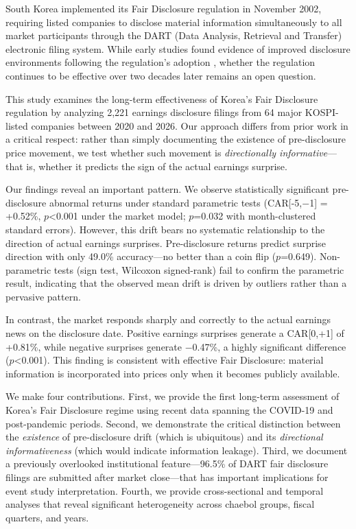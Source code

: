 \documentclass[review,authoryear]{elsarticle}
\begin{document}
South Korea implemented its Fair Disclosure regulation in November 2002, requiring listed companies to disclose material information simultaneously to all market participants through the DART (Data Analysis, Retrieval and Transfer) electronic filing system. While early studies found evidence of improved disclosure environments following the regulation's adoption \citep{yun2012fair, park2020disclosure}, whether the regulation continues to be effective over two decades later remains an open question.

This study examines the long-term effectiveness of Korea's Fair Disclosure regulation by analyzing 2,221 earnings disclosure filings from 64 major KOSPI-listed companies between 2020 and 2026. Our approach differs from prior work in a critical respect: rather than simply documenting the existence of pre-disclosure price movement, we test whether such movement is \textit{directionally informative}---that is, whether it predicts the sign of the actual earnings surprise.

Our findings reveal an important pattern. We observe statistically significant pre-disclosure abnormal returns under standard parametric tests (CAR[-5,$-$1] = +0.52\%, $p$<0.001 under the market model; $p$=0.032 with month-clustered standard errors). However, this drift bears no systematic relationship to the direction of actual earnings surprises. Pre-disclosure returns predict surprise direction with only 49.0\% accuracy---no better than a coin flip ($p$=0.649). Non-parametric tests (sign test, Wilcoxon signed-rank) fail to confirm the parametric result, indicating that the observed mean drift is driven by outliers rather than a pervasive pattern.

In contrast, the market responds sharply and correctly to the actual earnings news on the disclosure date. Positive earnings surprises generate a CAR[0,+1] of +0.81\%, while negative surprises generate $-$0.47\%, a highly significant difference ($p$<0.001). This finding is consistent with effective Fair Disclosure: material information is incorporated into prices only when it becomes publicly available.

We make four contributions. First, we provide the first long-term assessment of Korea's Fair Disclosure regime using recent data spanning the COVID-19 and post-pandemic periods. Second, we demonstrate the critical distinction between the \textit{existence} of pre-disclosure drift (which is ubiquitous) and its \textit{directional informativeness} (which would indicate information leakage). Third, we document a previously overlooked institutional feature---96.5\% of DART fair disclosure filings are submitted after market close---that has important implications for event study interpretation. Fourth, we provide cross-sectional and temporal analyses that reveal significant heterogeneity across chaebol groups, fiscal quarters, and years.
\end{document}
